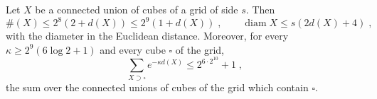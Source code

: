 \documentclass[11pt]{preprint}
\newcommand{\diam}{\operatorname{diam}}
\numberwithin{equation}{section}
\begin{document}
\begin{lemma}\label{lem:cube-count}
Let $X$ be a connected union of cubes of a grid of side $s$. Then
\begin{equation}\label{eq:cube-count}
    \#(X) \leqslant 2^8(2 + d(X)) \leqslant 2^9(1 + d(X))\;,
    \qquad
    \diam X \leqslant s(2d(X) + 4)\;,
\end{equation}
with the diameter in the Euclidean distance. Moreover, for every $\kappa \geqslant 2^9(6\log 2 + 1)$ and every cube $\square$ of the grid,
\begin{equation}\label{eq:domain-sum}
    \sum_{X \supset \square}e^{-\kappa d(X)} \leqslant 2^{6 \cdot 2^{10}} + 1\;,
\end{equation}
the sum over the connected unions of cubes of the grid which contain $\square$.
\end{lemma}
\end{document}
